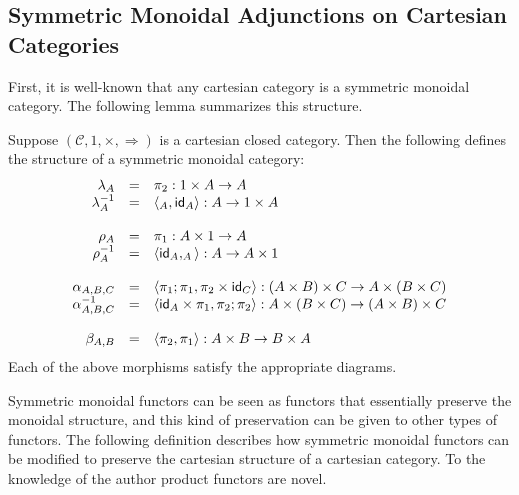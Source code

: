 \documentclass{article}
\let\mto\to
\let\to\rightarrow
\newcommand{\cat}[1]{\mathcal{#1}}
\newcommand{\id}[0]{\mathsf{id}}
\let\t\relax
\newcommand{\t}[0]{\mathsf{t}}
\begin{document}
\subsection{Symmetric Monoidal Adjunctions on Cartesian Categories}
\label{subsec:symmetric_monoidal_adjunctions_on_cartesian_categories}
First, it is well-known that any cartesian category is a symmetric
monoidal category. The following lemma summarizes this structure.
\begin{lemma}
  \label{lemma:CCC-is-SMC}
  Suppose $(\cat{C}, 1, \times, \Rightarrow)$ is a cartesian closed
  category.  Then the following defines the structure of a symmetric
  monoidal category:
  \[
  \begin{array}{rll}
    \lambda_A & = & \pi_2 : 1 \times A \mto A\\
    \lambda^{-1}_A & = & \langle \t_A , \id_A  \rangle : A \mto 1 \times A\\
    \\
    \rho_A & = & \pi_1 : A \times 1 \mto A\\
    \rho^{-1}_A & = & \langle \id_A , \t_A  \rangle : A \mto A \times 1\\
    \\
    \alpha_{A,B,C} & = & \langle \pi_1;\pi_1, \pi_2 \times \id_C \rangle : (A \times B) \times C \mto A \times (B \times C)\\
    \alpha^{-1}_{A,B,C} & = & \langle \id_A \times \pi_1, \pi_2;\pi_2 \rangle : A \times (B \times C) \mto (A \times B) \times C\\
    \\
    \beta_{A,B} & = & \langle \pi_2, \pi_1 \rangle : A \times B \mto B \times A\\
  \end{array}
  \]
  Each of the above morphisms satisfy the appropriate diagrams.
\end{lemma}

Symmetric monoidal functors can be seen as functors that essentially
preserve the monoidal structure, and this kind of preservation can be
given to other types of functors.  The following definition describes
how symmetric monoidal functors can be modified to preserve the
cartesian structure of a cartesian category.  To the knowledge of the
author product functors are novel.
\end{document}
